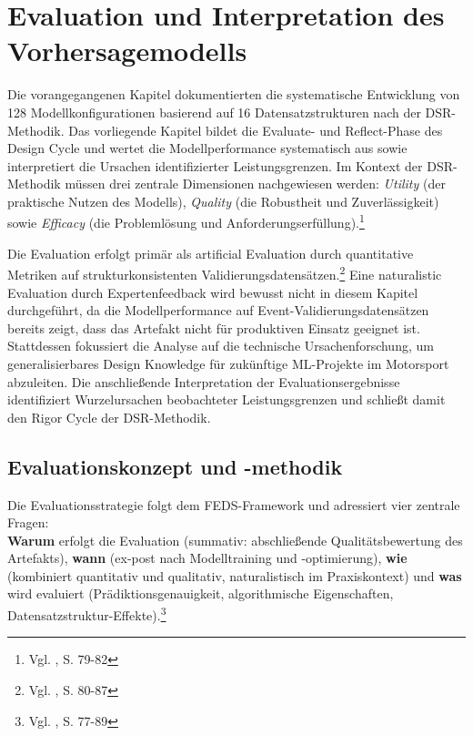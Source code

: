 \chapter{Evaluation und Interpretation des Vorhersagemodells}

Die vorangegangenen Kapitel dokumentierten die systematische Entwicklung von 128 Modellkonfigurationen basierend auf 16 Datensatzstrukturen nach der \ac{DSR}-Methodik. Das vorliegende Kapitel bildet die Evaluate- und Reflect-Phase des Design Cycle und wertet die Modellperformance systematisch aus sowie interpretiert die Ursachen identifizierter Leistungsgrenzen. Im Kontext der \ac{DSR}-Methodik müssen drei zentrale Dimensionen nachgewiesen werden: \textit{Utility} (der praktische Nutzen des Modells), \textit{Quality} (die Robustheit und Zuverlässigkeit) sowie \textit{Efficacy} (die Problemlösung und Anforderungserfüllung).\footnote{Vgl. \cite{Venable2016}, S. 79-82}

Die Evaluation erfolgt primär als artificial Evaluation durch quantitative Metriken auf strukturkonsistenten Validierungsdatensätzen.\footnote{Vgl. \cite{Venable2016}, S. 80-87} Eine naturalistic Evaluation durch Expertenfeedback wird bewusst nicht in diesem Kapitel durchgeführt, da die Modellperformance auf Event-Validierungsdatensätzen bereits zeigt, dass das Artefakt nicht für produktiven Einsatz geeignet ist. Stattdessen fokussiert die Analyse auf die technische Ursachenforschung, um generalisierbares Design Knowledge für zukünftige \ac{ML}-Projekte im Motorsport abzuleiten. Die anschließende Interpretation der Evaluationsergebnisse identifiziert Wurzelursachen beobachteter Leistungsgrenzen und schließt damit den Rigor Cycle der \ac{DSR}-Methodik.


\section{Evaluationskonzept und -methodik}

Die Evaluationsstrategie folgt dem FEDS-Framework und adressiert vier zentrale Fragen: \\ \textbf{Warum} erfolgt die Evaluation (summativ: abschließende Qualitätsbewertung des Artefakts), \textbf{wann} (ex-post nach Modelltraining und -optimierung), \textbf{wie} (kombiniert quantitativ und qualitativ, naturalistisch im Praxiskontext) und \textbf{was} wird evaluiert (Prädiktionsgenauigkeit, algorithmische Eigenschaften, Datensatzstruktur-Effekte).\footnote{Vgl. \cite{Venable2016}, S. 77-89}

